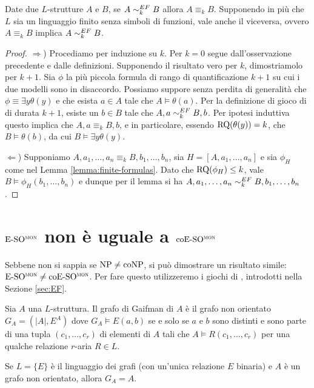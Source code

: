 \begin{teorema}
 Date due $L$-strutture $A$ e $B$, se $A \sim^{EF}_k B$ allora $A \equiv_k B$.
 Supponendo in più che $L$ sia un linguaggio finito senza simboli di funzioni,
 vale anche il viceversa, ovvero $A \equiv_k B$
 implica $A \sim^{EF}_k B$.
\end{teorema}
\begin{proof}
 $\Rightarrow$) Procediamo per induzione su $k$. Per $k=0$ segue dall'osservazione
 precedente e dalle definizioni. Supponendo il risultato vero per $k$, dimostriamolo
 per $k+1$. Sia $\phi$ la più piccola formula di rango di quantificazione $k+1$
 su cui i due modelli sono in disaccordo. Possiamo suppore senza perdita di generalità
 che $\phi \equiv \exists y \theta(y)$ e che esista $a \in A$ tale che $A \models \theta(a)$.
 Per la definizione di gioco di \EF{} di durata $k+1$, esiste un $b \in B$ tale che
 $A,a \sim^{EF}_k B,b$. Per ipotesi induttiva questo implica che
 $A,a \equiv_k B,b$, e in particolare, essendo $\operatorname{RQ}(\theta(y)) = k$, che
 $B \models \theta(b)$, da cui $B \models \exists y \theta(y)$.
 
 $\Leftarrow$) Supponiamo $A,a_1,\ldots, a_n \equiv_k B, b_1, \ldots, b_n$, sia
 $H=[A,a_1,\ldots,a_n]$ e sia $\phi_H$ come nel Lemma \ref{lemma:finite-formulas}.
 Dato che $\operatorname{RQ}(\phi_H) \leq k$, vale $B \models \phi_H(b_1,\ldots,b_n)$
 e dunque per il lemma si ha $A,a_1,\ldots, a_n \sim^{EF}_k B, b_1, \ldots, b_n$.
\end{proof}


\section{\texorpdfstring{$\operatorname{E-SO^{\normalfont\textsc{mon}}}$}{E-SOmon} non è uguale a \texorpdfstring{$\operatorname{coE-SO^{\normalfont\textsc{mon}}}$}{coE-SOmon}}

Sebbene non si sappia se $\operatorname{NP}\neq\operatorname{coNP}$, si può dimostrare un risultato simile: $\operatorname{E-SO^{\normalfont\textsc{mon}}} \neq \operatorname{coE-SO^{\normalfont\textsc{mon}}}$.
Per fare questo utilizzeremo i giochi di \EF{}, introdotti nella Sezione \ref{sec:EF}.


\begin{definizione}
  Sia $A$ una $L$-struttura.
  Il grafo di Gaifman di $A$ è il grafo non orientato $G_A = (|A|, E^A)$ dove $G_A \models E(a,b)$ se e solo se $a$ e $b$ sono distinti e sono parte di una tupla $(c_1,\dots,c_r)$ di elementi di $A$ tali che $A\models R(c_1,\dots,c_r)$ per una qualche relazione $r$-aria $R\in L$.
\end{definizione}

\begin{osservazione}
  Se $L=\{E\}$ è il linguaggio dei grafi (con un'unica relazione $E$ binaria) e $A$ è un grafo non orientato, allora $G_A=A$.
\end{osservazione}

